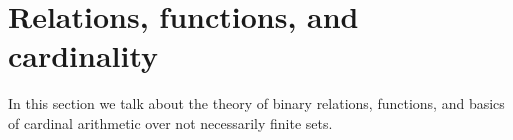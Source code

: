 \documentclass[12pt]{article}
\begin{document}
\begin{comment}
\item[Discussion:]  We want to show that the relation expressed by $A \in |B|$ is an equivalence relation on numerable sets.  $A \in |A|$ holds because of the first clause of the definition of numerable sets.  $A \in |B| \rightarrow B \in |A|$ is obvious.  If $A \in |B|$ and $B \in |C|$ we can show that
$A \in |C|$ if we can produce a set $|C'|$ disjoint from $A$ and $C$.  We can do this by the definition of cardinals and the second clause of the definition of numerable sets. 

If $A$ is equivalent to $D$ via $E_1$ and $D$ is equivalent to $B$ via $E_2$ and $B$ is equivalent to $E$ via $E_3$ and $E$ is equivalent to $C$ via $E_4$ and $C'$ is equivalent to $E$ via $E_5$ and disjoint from $A$ (there is such an $C'$ by the definition of numerability)  then $\{\{a\} \cup E_5[E_4[E_3[E_2[E_1[\{a\}]]]]] :a \in A\}$ is an equivalence from $A$ to $C'$, and we have $A \in |C|$.

\item[Axiom of Adjunction:]  For any numerable set $A$ and singleton $\{x\}$ of the same kind,
$A \cup \{x\}$ is numerable.

\item[Theorem:]  If $x \in A$ and $y \in B$ and $B \in |A|$, then $B -\{y\} \in |A -\{x\}|$.

\item[Definition:]  Define $\sigma(A)$ as $|A \cup \{x\}|$ where $x \not\in A$.



\end{description}

\newpage

\end{comment}

\section{Relations, functions, and cardinality}

In this section we talk about the theory of binary relations, functions, and basics of cardinal arithmetic over not necessarily finite sets.
\end{document}
